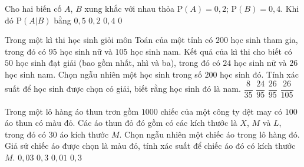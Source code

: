 \begin{ex}%
	Cho hai biến cố $A$, $B$ xung khắc với nhau thỏa $\mathrm{P}(A)=0{,}2$; $\mathrm{P}(B)=0{,}4$. Khi đó $\mathrm{P}\left(A|B\right)$ bằng
	\choice
	{$0{,}5$}
	{$0{,}2$}
	{$0{,}4$}
	{\True $0$}
\end{ex}	
\begin{ex}%
	Trong một kì thi học sinh giỏi môn Toán của một tỉnh có $200$ học sinh tham gia, trong đó có $95$ học sinh nữ và $105$ học sinh nam. Kết quả của kì thi cho biết có $50$ học sinh đạt giải (bao gồm nhất, nhì và ba), trong đó có $24$ học sinh nữ và $26$ học sinh nam. Chọn ngẫu nhiên một học sinh trong số $200$ học sinh đó. Tính xác suất để học sinh được chọn có giải, biết rằng học sinh đó là nam.
	\choice
	{$\dfrac{8}{35}$}
	{$\dfrac{24}{95}$}
	{$\dfrac{26}{95}$}
	{\True $\dfrac{26}{105}$}
\end{ex}
\begin{ex}%
	Trong một lô hàng áo thun trơn gồm $1000$ chiếc của một công ty dệt may có $100$ áo thun có màu đỏ. Các áo thun đỏ đó gồm có các kích thước là $X$, $M$ và $L$, trong đó có $30$ áo kích thước $M$. Chọn ngẫu nhiên một chiếc áo trong lô hàng đó. Giả sử chiếc áo được chọn là màu đỏ, tính xác suất để chiếc áo đó có kích thước $M$.
	\choice
	{$0{,}03$}
	{\True $0{,}3$}
	{$0{,}01$}
	{$0{,}3$}
\end{ex}
